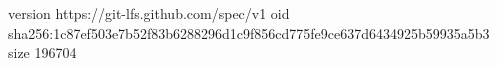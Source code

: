 version https://git-lfs.github.com/spec/v1
oid sha256:1c87ef503e7b52f83b6288296d1c9f856cd775fe9ce637d6434925b59935a5b3
size 196704
